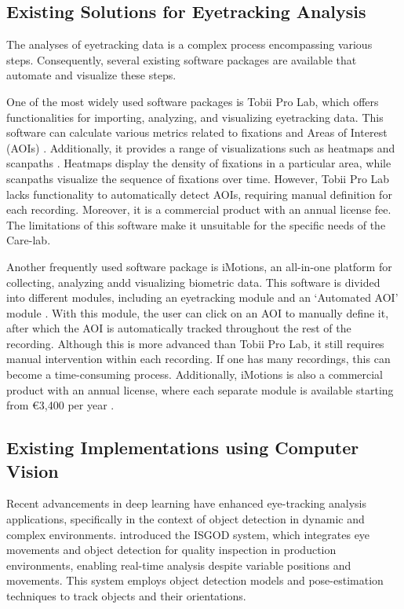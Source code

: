 \documentclass[english]{hogent-article}
\begin{document}
\subsection{Existing Solutions for Eyetracking Analysis}

The analyses of eyetracking data is a complex process encompassing various steps. 
Consequently, several existing software packages are available that automate and visualize these steps.

One of the most widely used software packages is Tobii Pro Lab, which offers functionalities for importing, analyzing, and visualizing eyetracking data.
This software can calculate various metrics related to fixations and Areas of Interest (AOIs) \autocite{Tobii2025a}.
Additionally, it provides a range of visualizations such as heatmaps and scanpaths \autocite{Tobii2025b}. 
Heatmaps display the density of fixations in a particular area, while scanpaths visualize the sequence of fixations over time.
However, Tobii Pro Lab lacks functionality to automatically detect AOIs, requiring manual definition for each recording.
Moreover, it is a commercial product with an annual license fee. 
The limitations of this software make it unsuitable for the specific needs of the Care-lab.

Another frequently used software package is iMotions, an all-in-one platform for collecting, analyzing andd visualizing biometric data.
This software is divided into different modules, including an eyetracking module and an `Automated AOI' module \autocite{iMotions2025a}.
With this module, the user can click on an AOI to manually define it, after which the AOI is automatically tracked throughout the rest of the recording.
Although this is more advanced than Tobii Pro Lab, it still requires manual intervention within each recording. If one has many recordings, this can become a time-consuming process.
Additionally, iMotions is also a commercial product with an annual license, where each separate module is available starting from €3,400 per year \autocite{iMotions2025b}.

\subsection{Existing Implementations using Computer Vision}

Recent advancements in deep learning have enhanced eye-tracking analysis applications, specifically in the context of object detection in dynamic and complex environments.
\textcite{Cho2024} introduced the ISGOD system, which integrates eye movements and object detection for quality inspection in production 
environments, enabling real-time analysis despite variable positions and movements. 
This system employs object detection models and pose-estimation techniques to track objects and their orientations.
\end{document}
